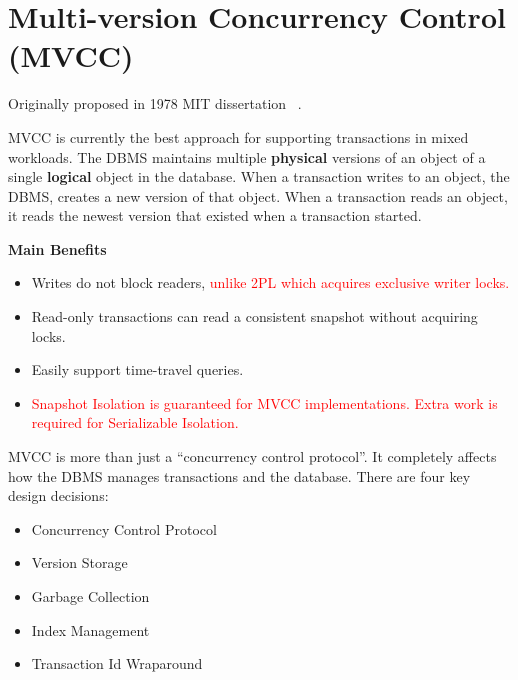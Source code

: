\documentclass[11pt]{article}
\newcommand{\rr}[1]{\textcolor{red}{#1}}
\begin{document}
\maketitle
\thispagestyle{plain}

\section{Multi-version Concurrency Control (MVCC)}
Originally proposed in 1978 MIT dissertation ~\cite{reed1978naming}.

MVCC is currently the best approach for supporting transactions in mixed workloads.
The DBMS maintains multiple \textbf{physical} versions of an object of a single 
\textbf{logical} object in the database. 
When a transaction writes to an object, the DBMS, creates a new version of that object.
When a transaction reads an object, it reads the newest version that existed when a 
transaction started.
    
\textbf{Main Benefits}
\begin{itemize}
    \item Writes do not block readers, \rr{unlike 2PL which acquires exclusive writer locks.}
    \item Read-only transactions can read a consistent snapshot without acquiring locks.
    \item Easily support time-travel queries.
    \item \rr{Snapshot Isolation is guaranteed for MVCC implementations. Extra work is required for Serializable Isolation.}
\end{itemize}

MVCC is more than just a ``concurrency control protocol''. It completely affects how the 
DBMS manages transactions and the database. There are four key design decisions:~\cite{p781-wu}
\begin{itemize}
    \item Concurrency Control Protocol
    \item Version Storage
    \item Garbage Collection
    \item Index Management
    \item Transaction Id Wraparound
\end{itemize}
\end{document}
